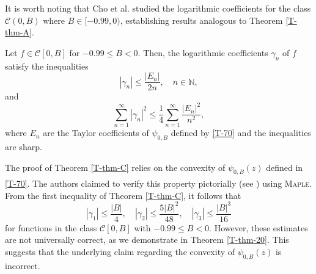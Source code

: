 \documentclass[a4paper,12pt]{amsart}
\theoremstyle{definition}
\newenvironment{customthm}[1]
  {\renewcommand\theinnercustomthm{#1}\innercustomthm}
  {\endinnercustomthm}
\begin{document}




It is worth noting that Cho et al. \cite[Theorem 2.2]{cho-Alimohammadi-2021} studied the logarithmic coefficients for the class $\mathcal{C}(0,B)$ where $B \in [-0.99, 0)$, establishing results analogous to Theorem \ref{T-thm-A}.


\begin{customthm}{C}\cite[Theorem 2.2]{cho-Alimohammadi-2021}\label{T-thm-C}
Let \( f \in \mathcal{C}[0, B] \) for \(-0.99 \leq B < 0\). Then, the logarithmic coefficients $\gamma_n$ of \( f \) satisfy the inequalities
$$
|\gamma_n| \leq \frac{|E_n|}{2n}, \quad n \in \mathbb{N},
$$
and
\[
\sum_{n=1}^\infty |\gamma_n|^2 \leq \frac{1}{4} \sum_{n=1}^\infty \frac{|E_n|^2}{n^2},
\]
where $ E_n $ are the Taylor coefficients of $\psi_{0,B}$ defined by \eqref{T-70} and the inequalities are sharp.
\end{customthm}


The proof of Theorem \ref{T-thm-C} relies on the convexity of $\psi_{0,B}(z)$ defined in \eqref{T-70}. The authors claimed to verify this property pictorially (see \cite[Fig. 2]{cho-Alimohammadi-2021}) using \textsc{Maple}\textsuperscript{\texttrademark}. From the first inequality of Theorem \ref{T-thm-C}, it follows that
$$|\gamma_1| \le \frac{|B|}{4}, \quad |\gamma_2| \le \frac{5|B|^2}{48}, \quad |\gamma_3| \le \frac{|B|^3}{16}
$$
for functions in the class $\mathcal{C}[0, B]$ with $-0.99 \leq B < 0$. However, these estimates are not universally correct, as we demonstrate in Theorem \ref{T-thm-20}. This suggests that the underlying claim regarding the convexity of $\psi_{0,B}(z)$ is incorrect.\\
\end{document}
